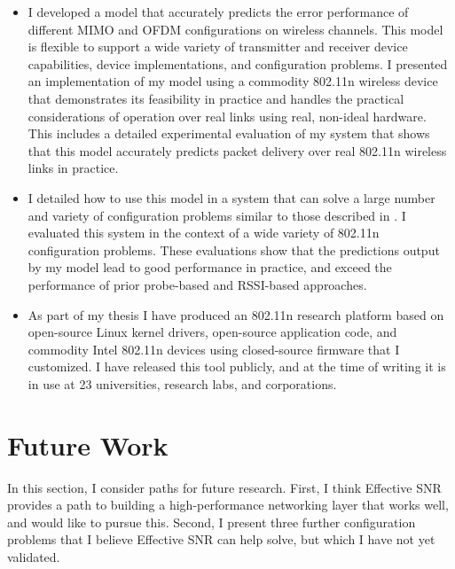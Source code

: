 \begin{itemize}[leftmargin=0.5cm,parsep=1ex,itemsep=1ex,topsep=1ex]
\item I developed a model that accurately predicts the error performance of different MIMO and OFDM configurations on wireless channels. This model is flexible to support a wide variety of transmitter and receiver device capabilities, device implementations, and configuration problems. I presented an implementation of my model using a commodity 802.11n wireless device that demonstrates its feasibility in practice and handles the practical considerations of operation over real links using real, non-ideal hardware. This includes a detailed experimental evaluation of my system that shows that this model accurately predicts packet delivery over real 802.11n wireless links in practice.

\item I detailed how to use this model in a system that can solve a large number and variety of configuration problems similar to those described in . I evaluated this system in the context of a wide variety of 802.11n configuration problems.
These evaluations show that the predictions output by my model lead to good performance in practice, and exceed the performance of prior probe-based and RSSI-based approaches.

\item As part of my thesis I have produced an 802.11n research platform based on open-source Linux kernel drivers, open-source application code, and commodity Intel 802.11n devices using closed-source firmware that I customized.
I have released this tool publicly, and at the time of writing it is in use at 23 universities, research labs, and corporations.
\end{itemize}

\section{Future Work}
In this section, I consider paths for future research. First, I think Effective SNR provides a path to building a high-performance networking layer that works well, and would like to pursue this. Second, I present three further configuration problems that I believe Effective SNR can help solve, but which I have not yet validated.

